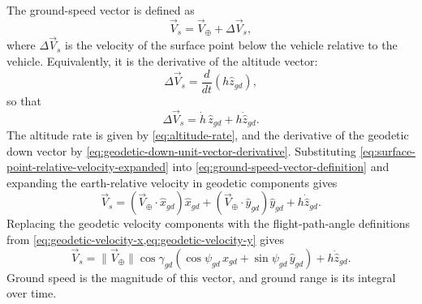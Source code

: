 The ground-speed vector is defined as
\begin{equation}
  \vec V_s=\vec V_{\oplus}+\Delta\vec V_s,
  \label{eq:ground-speed-vector-definition}
\end{equation}
where $\Delta\vec V_s$ is the velocity of the surface point below the vehicle
relative to the vehicle. Equivalently, it is the derivative of the altitude vector:
\begin{equation}
  \Delta\vec V_s
  =\frac{d}{dt}\left(h\hat z_{gd}\right),
  \label{eq:surface-point-relative-velocity}
\end{equation}
so that
\begin{equation}
  \Delta\vec V_s
  =\dot h\,\hat z_{gd}+h\dot{\hat z}_{gd}.
  \label{eq:surface-point-relative-velocity-expanded}
\end{equation}
The altitude rate is given by \cref{eq:altitude-rate}, and the derivative of the
geodetic down vector by \cref{eq:geodetic-down-unit-vector-derivative}. Substituting
\cref{eq:surface-point-relative-velocity-expanded} into
\cref{eq:ground-speed-vector-definition} and expanding the earth-relative velocity
in geodetic components gives
\begin{equation}
  \vec V_s
  =\left(\vec V_{\oplus}\mathbin{\cdot}\hat x_{gd}\right)\hat x_{gd}
   +\left(\vec V_{\oplus}\mathbin{\cdot}\hat y_{gd}\right)\hat y_{gd}
   +h\dot{\hat z}_{gd}.
  \label{eq:ground-speed-geodetic-components}
\end{equation}
Replacing the geodetic velocity components with the flight-path-angle definitions
from \cref{eq:geodetic-velocity-x,eq:geodetic-velocity-y} gives
\begin{equation}
  \vec V_s
  =\lVert\vec V_{\oplus}\rVert\cos\gamma_{gd}
    \left(
      \cos\psi_{gd}\,\hat x_{gd}
      +\sin\psi_{gd}\,\hat y_{gd}
    \right)
   +h\dot{\hat z}_{gd}.
  \label{eq:ground-speed-final}
\end{equation}
Ground speed is the magnitude of this vector, and ground range is its integral over
time.
